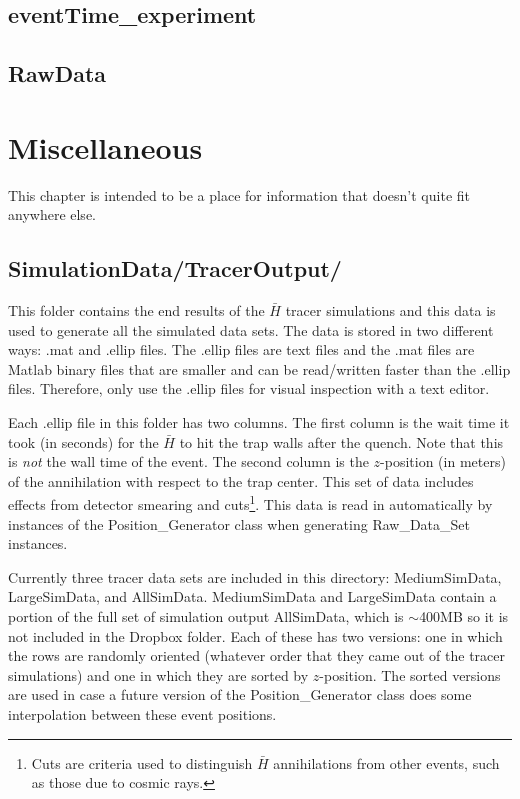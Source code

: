 \documentclass[12pt]{report}
\begin{document}
\section{eventTime\_experiment}
\section{RawData}




\chapter{Miscellaneous}
This chapter is intended to be a place for information that doesn't quite fit anywhere else.

\section{SimulationData/TracerOutput/}
This folder contains the end results of the $\bar{H}$ tracer simulations and this data is used to generate all the simulated data sets.  The data is stored in two different ways: .mat and .ellip files.  The .ellip files are text files and the .mat files are Matlab binary files that are smaller and can be read/written faster than the .ellip files.  Therefore, only use the .ellip files for visual inspection with a text editor.

Each .ellip file in this folder has two columns.  The first  column is the wait time it took (in seconds) for the $\bar{H}$ to hit the trap walls after the quench.  Note that this is \textit{not} the wall time of the event.  The second column is the $z$-position (in meters) of the annihilation with respect to the trap center.  This set of data includes effects from detector smearing and cuts\footnote{Cuts are criteria used to distinguish $\bar{H}$ annihilations from other events, such as those due to cosmic rays.}.  This data is read in automatically by instances of the Position\_Generator class when generating Raw\_Data\_Set instances.

Currently three tracer data sets are included in this directory: MediumSimData, LargeSimData, and AllSimData.  MediumSimData and LargeSimData contain a portion of the full set of simulation output AllSimData, which is ${\sim}$400MB so it is not included in the Dropbox folder.  Each of these has two versions: one in which the rows are randomly oriented (whatever order that they came out of the tracer simulations) and one in which they are sorted by $z$-position.  The sorted versions are used in case a future version of the Position\_Generator class does some interpolation between these event positions.
\end{document}
